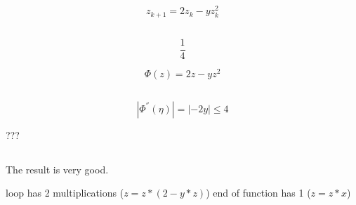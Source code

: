 \documentclass[12pt]{article}
\begin{document}
\subsection{}
$$z_{k+1}=2z_k-yz_k^2$$

\subsection{}
$$\frac{1}{4}$$

$$\Phi(z)=2z-yz^2$$

\subsection{}
$$|\Phi^{''}(\eta)|=|-2y|\le 4$$


???
\subsection{}
The result is very good.

loop has 2 multiplications ($z=z*(2-y*z)$)
end of function has 1 ($z=z*x$)
\end{document}
